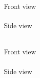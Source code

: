 \pagestyle{empty}

\begin{Large}
Front view\\
\\
Side view\\
\\
\end{Large}
\begin{large}
Front view\\
\\
Side view\\
\\
\end{large}

